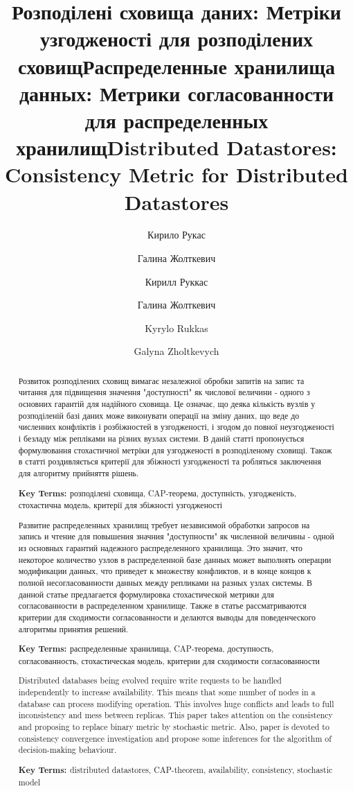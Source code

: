 \documentclass[a4paper,14pt]{llncs}
\newcommand{\keyterms}[1]{\par{\bfseries{ Key Terms: }}#1}
\begin{document}
\title{Розподілені сховища даних: Метріки узгодженості для розподілених сховищ}
\author{Кирило Рукас\and Галина Жолткевич}
\title{Распределенные хранилища данных: Метрики согласованности для распределенных хранилищ}
\author{Кирилл Руккас\and Галина Жолткевич}
\title{Distributed Datastores: Consistency Metric for Distributed Datastores}
\author{Kyrylo Rukkas\and Galyna Zholtkevych}
\maketitle
\begin{abstract}
Розвиток розподілених сховищ вимагає незалежної обробки запитів на запис та читання для підвищення значення "доступності" як числової величини - одного з основних гарантій для надійного сховища.
Це означає, що деяка кількість вузлів у розподіленій базі даних може виконувати операції на зміну даних, що веде до численних конфліктів і розбіжностей в узгодженості, і згодом до повної неузгодженості і безладу між репліками на різних вузлах системи. В даній статті пропонується формулювання стохастичної метріки для 
узгодженості в розподіленому сховищі. Також в статті роздивляється критерії для збіжності узгодженості та робляться заключення для алгоритму  прийняття рішень.
\keyterms розподілені сховища, CAP-теорема, доступність, узгодженість, стохастична модель, критерії для збіжності узгодженості
\end{abstract}
\begin{abstract}
Развитие распределенных хранилищ требует независимой обработки запросов на запись и чтение для повышения значния "доступности" як численной величины - 
одной из основных гарантий надежного распределенного хранилища. Это значит, что некоторое количество узлов в распределенной базе данных может выполнять
операции модификации данных, что приведет к множеству конфликтов, и в конце концов к полной несогласованности данных между репликами на разных узлах системы.
В данной статье предлагается формулировка стохастической метрики для согласованности в распределенном хранилище. Также в статье рассматриваются критерии для сходимости согласованности и делаются выводы для поведенческого алгоритмы принятия решений.
\keyterms распределенные хранилища, CAP-теорема, доступность, согласованность, стохастическая модель, критерии для сходимости согласованности

\end{abstract}
\begin{abstract}
Distributed databases being evolved require write requests to be handled independently to increase availability.
This means that some number of nodes in a database can process modifying operation. This involves huge conflicts and leads to full inconsistency and mess between replicas. This paper takes attention on the consistency and proposing to replace binary metric by stochastic metric. Also, paper is devoted to 
consistency convergence investigation and propose some inferences for the algorithm of decision-making behaviour.
\keyterms distributed datastores, CAP-theorem, availability, consistency, stochastic model
\end{abstract}
\end{document}
